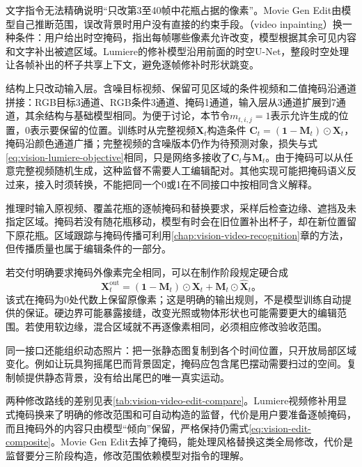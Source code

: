 文字指令无法精确说明“只改第3至40帧中花瓶占据的像素”。Movie Gen Edit由模型自己推断范围，误改背景时用户没有直接的约束手段。（video inpainting）换一种条件：用户给出时空掩码，指出每帧哪些像素允许改变，模型根据其余可见内容和文字补出被遮区域。Lumiere的修补模型沿用前面的时空U-Net，整段时空处理让各帧补出的杯子共享上下文，避免逐帧修补时形状跳变。

结构上只改动输入层。含噪目标视频、保留可见区域的条件视频和二值掩码沿通道拼接：RGB目标3通道、RGB条件3通道、掩码1通道，输入层从3通道扩展到7通道，其余结构与基础模型相同。为便于讨论，本节令$m_{t,i,j}=1$表示允许生成的位置，0表示要保留的位置。训练时从完整视频$\bm X_t$构造条件
$\bm C_t=(\bm1-\bm M_t)\odot\bm X_t$，
掩码沿颜色通道广播；完整视频的含噪版本仍作为待预测对象，损失与式\eqref{eq:vision-lumiere-objective}相同，只是网络多接收了$\bm C_t$与$\bm M_t$。由于掩码可以从任意完整视频随机生成，这种监督不需要人工编辑配对。其他实现可能把掩码语义反过来，接入时须转换，不能把同一个0或1在不同接口中按相同含义解释。

推理时输入原视频、覆盖花瓶的逐帧掩码和替换要求，采样后检查边缘、遮挡及未指定区域。掩码若没有随花瓶移动，模型有时会在旧位置补出杯子，却在新位置留下原花瓶。区域跟踪与掩码传播可利用\ref{chap:vision-video-recognition}章的方法，但传播质量也属于编辑条件的一部分。

若交付明确要求掩码外像素完全相同，可以在制作阶段规定硬合成
\begin{equation}
  \bm X_t^{\mathrm{out}}
  =(\bm1-\bm M_t)\odot\bm X_t+
     \bm M_t\odot\widehat{\bm X}_t\text{。}
  \label{eq:vision-edit-composite}
\end{equation}
该式在掩码为0处代数上保留原像素；这是明确的输出规则，不是模型训练自动提供的保证。硬边界可能暴露接缝，改变光照或物体形状也可能需要更大的编辑范围。若使用软边缘，混合区域就不再逐像素相同，必须相应修改验收范围。

同一接口还能组织动态照片：把一张静态图复制到各个时间位置，只开放局部区域变化。例如让玩具狗摇尾巴而背景固定，掩码应包含尾巴摆动需要扫过的空间。复制帧提供静态背景，没有给出尾巴的唯一真实运动。

两种修改路线的差别见表\ref{tab:vision-video-edit-compare}。Lumiere视频修补用显式掩码换来了明确的修改范围和可自动构造的监督，代价是用户要准备逐帧掩码，而且掩码外的内容只由模型“倾向”保留，严格保持仍需式\eqref{eq:vision-edit-composite}。Movie Gen Edit去掉了掩码，能处理风格替换这类全局修改，代价是监督要分三阶段构造，修改范围依赖模型对指令的理解。

